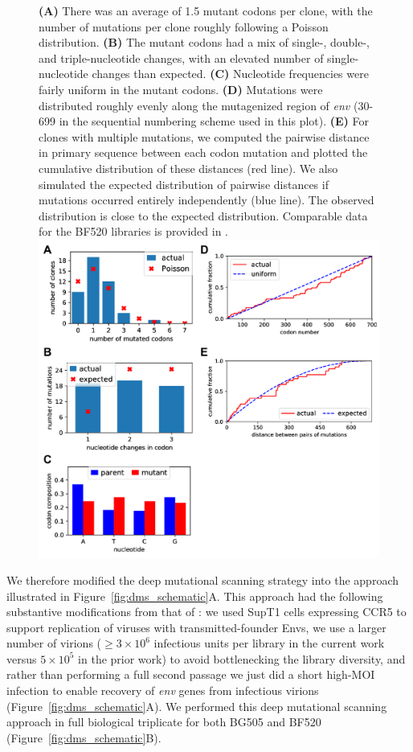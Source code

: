\documentclass[9pt]{elife}
\begin{document}
\begin{figure}
{{\bf(A)} There was an average of 1.5 mutant codons per clone, with the number of mutations per clone roughly following a Poisson distribution. 
{\bf(B)} The mutant codons had a mix of single-, double-, and triple-nucleotide changes, with an elevated number of single-nucleotide changes than expected.
{\bf(C)} Nucleotide frequencies were fairly uniform in the mutant codons.
{\bf(D)} Mutations were distributed roughly evenly along the mutagenized region of {\it env} (30-699 in the sequential numbering scheme used in this plot).
{\bf(E)} For clones with multiple mutations, we computed the pairwise distance in primary sequence between each codon mutation and plotted the cumulative distribution of these distances (red line). 
We also simulated the expected distribution of pairwise distances if mutations occurred entirely independently (blue line). 
The observed distribution is close to the expected distribution.
Comparable data for the BF520 libraries is provided in \citet{dingens2017comprehensive}.
}{\includegraphics[width=\textwidth]{figures/sanger_sequencing_supp/sanger_sequencing_supp.pdf}}
\end{figure}

We therefore modified the deep mutational scanning strategy into the approach illustrated in Figure~\ref{fig:dms_schematic}A.
This approach had the following substantive modifications from that of \citet{haddox2016experimental}: we used SupT1 cells expressing CCR5 to support replication of viruses with transmitted-founder Envs, we use a larger number of virions ($\ge 3 \times 10^6$ infectious units per library in the current work versus $5\times 10^5$ in the prior work) to avoid bottlenecking the library diversity, and rather than performing a full second passage we just did a short high-MOI infection to enable recovery of \textit{env} genes from infectious virions (Figure~\ref{fig:dms_schematic}A).
We performed this deep mutational scanning approach in full biological triplicate for both BG505 and BF520 (Figure~\ref{fig:dms_schematic}B).
\end{document}
